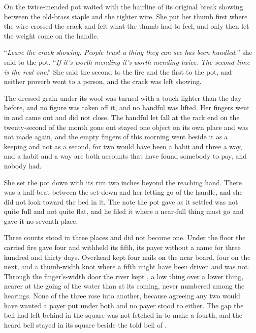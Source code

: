 \scenebreak

On  the twice-mended pot waited with the hairline of its original break showing between the old-brass staple and the tighter wire. She put her thumb first where the wire crossed the crack and felt what the thumb had to feel, and only then let the weight come on the handle.

“\emph{Leave the crack showing. People trust a thing they can see has been handled},” she said to the pot. “\emph{If it's worth mending it's worth mending twice. The second time is the real one}.” She said the second to the fire and the first to the pot, and neither proverb went to a person, and the crack was left showing.

The dressed grain under its wool was turned with a touch lighter than the day before, and no figure was taken off it, and no handful was lifted. Her fingers went in and came out and did not close. The handful let fall at the rack end on the twenty-second of the month gone out stayed one object on its own place and was not made again, and the empty fingers of this morning went beside it as a keeping and not as a second, for two would have been a habit and three a way, and a habit and a way are both accounts that have found somebody to pay, and nobody had.

She set the pot down with its rim two inches beyond the reaching hand. There was a half-beat between the set-down and her letting go of the handle, and she did not look toward the bed in it. The note the pot gave as it settled was not quite full and not quite flat, and he filed it where a near-full thing must go and gave it no seventh place.

Three counts stood in three places and did not become one. Under the floor the carried fire gave four and withheld its fifth, its payer without a name for three hundred and thirty days. Overhead  kept four nails on the near board, four on the next, and a thumb-width knot where a fifth might have been driven and was not. Through the finger's-width door the river kept , a low thing over a lower thing, nearer at the going of the water than at its coming, never numbered among the hearings. None of the three rose into another, because agreeing any two would have wanted a payer put under both and no payer stood to either. The gap the bell had left behind in the square was not fetched in to make a fourth, and the heard bell stayed in its square beside the told bell of .

